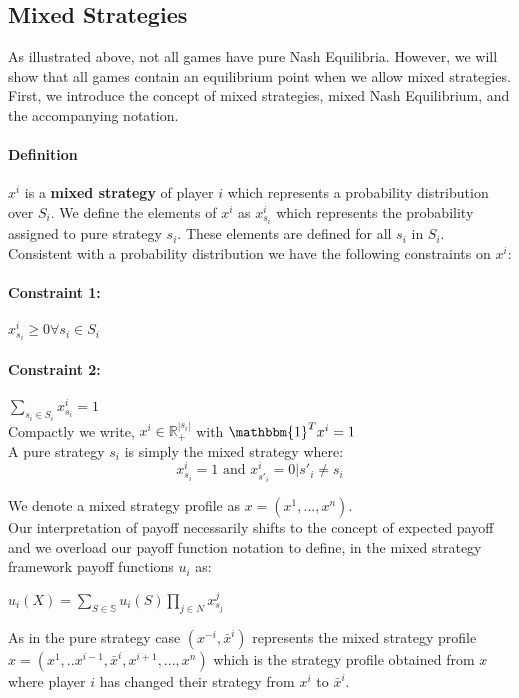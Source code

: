 \documentclass[12pt]{article}
\newcommand{\Definition}{\paragraph{Definition}}
\begin{document}
\subsection{Mixed Strategies}

As illustrated above, not all games have pure Nash Equilibria. However, we will show that all games contain an equilibrium point when we allow mixed strategies. First, we introduce the concept of mixed strategies, mixed Nash Equilibrium, and the accompanying notation.

\Definition $x^i$ is a \textbf{mixed strategy} of player $i$ which represents a probability distribution over $S_i$. We define the elements of $x^i$ as $x^i_{s_i}$ which represents the probability assigned to pure strategy $s_i$. These elements are defined for all $s_i$ in $S_i$.\\

Consistent with a probability distribution we have the following constraints on $x^i$:

\paragraph{Constraint 1:} $x^i_{s_i} \geq 0 \forall s_i \in S_i$

\paragraph{Constraint 2:} $\sum\limits_{s_i \in S_i} x^i_{s_i} = 1$\\
Compactly we write, $x^i \in \mathbb{R}^{|s_i|}_+$ with $\mathbbm{1}^T x^i = 1$\\

A pure strategy $s_i$ is simply the mixed strategy where:
\begin{equation*}
	x^i_{s_i} = 1 \text{ and }  x^i_{s'_i} = 0 | s'_i \neq s_i
\end{equation*}

We denote a mixed strategy profile as $x = (x^1, ... , x^n)$.\\ 

Our interpretation of payoff necessarily shifts to the concept of expected payoff and we overload our payoff function notation to define, in the mixed strategy framework payoff functions $u_i$ as:
\begin{center}
$u_i(X) = \sum\limits_{S \in \mathbb{S}} u_i(S)\prod\limits_{j \in N} x^j_{s_j}$\\
\end{center}
As in the pure strategy case $(x^{-i}, \bar{x}^i)$ represents the mixed strategy profile $x = (x^1, .. x^{i-1}, \bar{x}^i, x^{i+1}, ... ,x^n)$ which is the strategy profile obtained from $x$ where player $i$ has changed their strategy from $x^i$ to $\bar{x}^i$.\\
\end{document}
